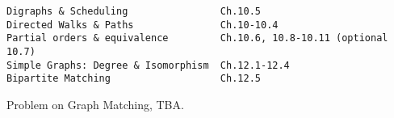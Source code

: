 \documentclass[handout]{mcs}
\begin{document}
\renewcommand{\reading}{
\begin{itemize}
\item Chapter~\bref{digraphs_chap}.\ \emph{Directed Graphs} (omit~\bref{poset-as-sets_sec}).
\item Chapter~\bref{simple_graphs_chap}.\ \emph{Simple Graphs} through~\bref{bipartitesec} 
\end{itemize}}


\begin{staffnotes}
\begin{verbatim}
Digraphs & Scheduling                Ch.10.5
Directed Walks & Paths               Ch.10-10.4
Partial orders & equivalence         Ch.10.6, 10.8-10.11 (optional 10.7)
Simple Graphs: Degree & Isomorphism  Ch.12.1-12.4
Bipartite Matching                   Ch.12.5
\end{verbatim}
\end{staffnotes}




\begin{problem}
Problem on Graph Matching, TBA.
\end{problem}
\end{document}
